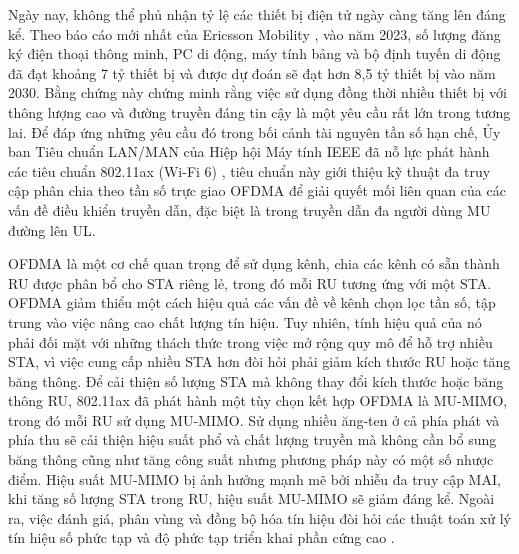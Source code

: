 Ngày nay, không thể phủ nhận tỷ lệ các thiết bị điện tử ngày càng tăng lên đáng kể. Theo báo cáo mới nhất của Ericsson Mobility \cite{Ericsson}, vào năm 2023, số lượng đăng ký điện thoại thông minh, PC di động, máy tính bảng và bộ định tuyến di động đã đạt khoảng 7 tỷ thiết bị và được dự đoán sẽ đạt hơn 8,5 tỷ thiết bị vào năm 2030.
Bằng chứng này chứng minh rằng việc sử dụng đồng thời nhiều thiết bị với thông lượng cao và đường truyền đáng tin cậy là một yêu cầu rất lớn trong tương lai. Để đáp ứng những yêu cầu đó trong bối cảnh tài nguyên tần số hạn chế, Ủy ban Tiêu chuẩn LAN/MAN của Hiệp hội Máy tính IEEE đã nỗ lực phát hành các tiêu chuẩn 802.11ax (Wi-Fi 6) \cite{IEEEStd}, tiêu chuẩn này giới thiệu kỹ thuật đa truy cập phân chia theo tần số trực giao \acrshort{OFDMA} để giải quyết mối liên quan của các vấn đề điều khiển truyền dẫn, đặc biệt là trong truyền dẫn đa người dùng \acrshort{MU} đường lên \acrshort{UL}.


\acrshort{OFDMA} là một cơ chế quan trọng để sử dụng kênh, chia các kênh có sẵn thành \acrfull{RU} được phân bổ cho \acrshort{STA} riêng lẻ, trong đó mỗi \acrshort{RU} tương ứng với một \acrshort{STA}. OFDMA giảm thiểu một cách hiệu quả các vấn đề về kênh chọn lọc tần số, tập trung vào việc nâng cao chất lượng tín hiệu. Tuy nhiên, tính hiệu quả của nó phải đối mặt với những thách thức trong việc mở rộng quy mô để hỗ trợ nhiều STA, vì việc cung cấp nhiều STA hơn đòi hỏi phải giảm kích thước RU hoặc tăng băng thông.
Để cải thiện số lượng STA mà không thay đổi kích thước hoặc băng thông RU, 802.11ax đã phát hành một tùy chọn kết hợp OFDMA là \acrfull{MU-MIMO}, trong đó mỗi RU sử dụng MU-MIMO. Sử dụng nhiều ăng-ten ở cả phía phát và phía thu sẽ cải thiện hiệu suất phổ và chất lượng truyền mà không cần bổ sung băng thông cũng như tăng công suất nhưng phương pháp này có một số nhược điểm.
Hiệu suất MU-MIMO bị ảnh hưởng mạnh mẽ bởi nhiễu đa truy cập \acrfull{MAI}, khi tăng số lượng STA trong RU, hiệu suất MU-MIMO sẽ giảm đáng kể.
Ngoài ra, việc đánh giá, phân vùng và đồng bộ hóa tín hiệu đòi hỏi các thuật toán xử lý tín hiệu số phức tạp và độ phức tạp triển khai phần cứng cao \cite{MIMO_complex}.

